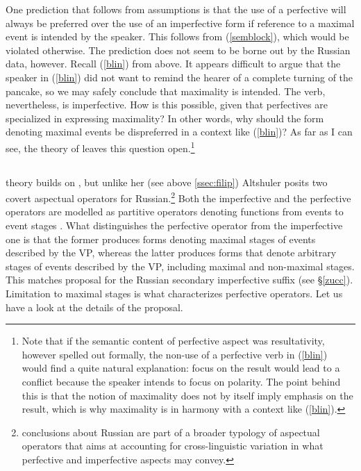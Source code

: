 \documentclass[output=paper,colorlinks,citecolor=brown]{langscibook}
\begin{document}
One prediction that follows from  assumptions is that the use of a perfective will always be preferred over the use of an imperfective form if reference to a maximal event is intended by the speaker. This follows from (\ref{semblock}), which would be violated otherwise. The prediction does not seem to be borne out by the Russian data, however. Recall (\ref{blin}) from above. It appears difficult to argue that the speaker in (\ref{blin}) did not want to remind the hearer of a complete turning of the pancake, so we may safely conclude that maximality is intended. The verb, nevertheless, is imperfective. How is this possible, given that perfectives are specialized in expressing maximality? In other words, why should the form denoting maximal events be dispreferred in a context like (\ref{blin})?
As far as I can see, the theory of \citet{Filip2008} leaves this question open.\footnote{Note that if the semantic content of perfective aspect was resultativity, however spelled out formally, the non-use of a perfective verb in (\ref{blin}) would find a quite natural explanation: focus on the result would lead to a conflict because the speaker intends to focus on polarity. The point behind this is that the notion of maximality does not by itself imply emphasis on the result, which is why maximality is in harmony with a context like (\ref{blin}).} 

\subsection{\citet{Altshuler2014}} 

 theory builds on \citet{Filip2008}, but unlike her (see above \ref{ssec:filip}) Altshuler posits two covert aspectual operators for Russian.\footnote{ conclusions about Russian are part of a broader typology of aspectual operators that aims at accounting for cross-linguistic variation in what perfective and imperfective aspects may convey.} Both the imperfective and the perfective operators are modelled as partitive operators denoting functions from events to event stages \citep[738]{Altshuler2014}. What distinguishes the perfective operator from the imperfective one is that the former produces forms denoting maximal stages of events described by the VP, whereas the latter produces forms that denote arbitrary stages of events described by the VP, including maximal and non-maximal stages. This matches  proposal for the Russian secondary imperfective suffix (see \S \ref{zucc}). Limitation to maximal stages is what characterizes perfective operators. Let us have a look at the details of the proposal.  
\end{document}
